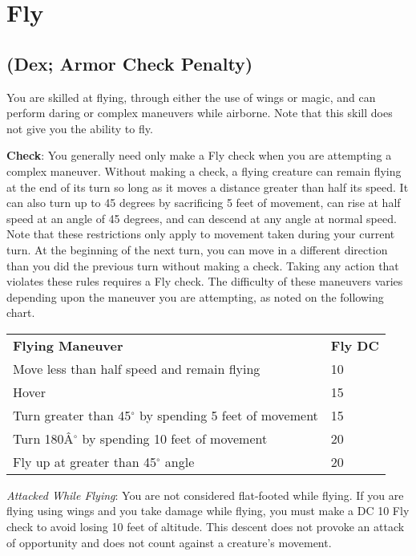 \section{Fly}

\label{f0}				
\subsection{(Dex; Armor Check Penalty)}

				
You are skilled at flying, through either the use of wings or magic, and can perform daring or complex maneuvers while airborne. Note that this skill does not give you the ability to fly.
				
\textbf{Check}: You generally need only make a Fly check when you are attempting a complex maneuver. Without making a check, a flying creature can remain flying at the end of its turn so long as it moves a distance greater than half its speed. It can also turn up to 45 degrees by sacrificing 5 feet of movement, can rise at half speed at an angle of 45 degrees, and can descend at any angle at normal speed. Note that these restrictions only apply to movement taken during your current turn. At the beginning of the next turn, you can move in a different direction than you did the previous turn without making a check. Taking any action that violates these rules requires a Fly check. The difficulty of these maneuvers varies depending upon the maneuver you are attempting, as noted on the following chart.

\begin{table}
 \sffamily
 \begin{tabular}{ll}
\textbf{Flying Maneuver} & \textbf{Fly DC}\\
Move less than half speed and remain flying & 10\\
Hover & 15\\
Turn greater than 45\mbox{${}^\circ$} by spending 5 feet of movement & 15\\
Turn 180\^A\mbox{${}^\circ$} by spending 10 feet of movement & 20\\
Fly up at greater than 45\mbox{${}^\circ$} angle & 20\\  
 \end{tabular}

\end{table}
				
\textit{Attacked While Flying}: You are not considered flat-footed while flying. If you are flying using wings and you take damage while flying, you must make a DC 10 Fly check to avoid losing 10 feet of altitude. This descent does not provoke an attack of opportunity and does not count against a creature's movement.
				
